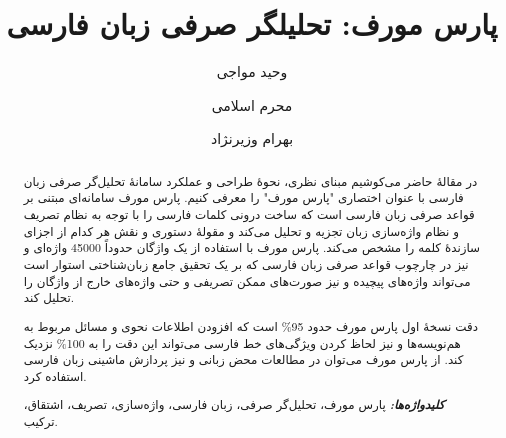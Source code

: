 \documentclass[12pt,onecolumn,a4paper]{article}
\providecommand{\keywords}[1]{\textbf{\textit{کلیدواژه‌ها:}} #1}
\begin{document}
    \title{پارس مورف: تحلیلگر صرفی زبان فارسی}
    \author[1]{وحید مواجی}
    \author[2]{محرم اسلامی}
    \author[1]{بهرام وزیرنژاد}
    \date{}
    \maketitle

    \begin{abstract}
        در مقالهٔ حاضر می‌کوشیم مبنای نظری، نحوهٔ طراحی و عملکرد سامانهٔ تحلیل‌گر صرفی زبان فارسی با عنوان اختصاری "پارس مورف" را معرفی کنیم. پارس مورف سامانه‌ای مبتنی بر قواعد صرفی زبان فارسی است که ساخت درونی کلمات فارسی را با توجه به نظام تصریف و نظام واژه‌سازی زبان تجزیه و تحلیل می‌کند و مقولهٔ دستوری و نقش هر کدام از اجزای سازندهٔ کلمه را مشخص می‌کند. پارس مورف با استفاده از یک واژگان حدوداً 45000 واژه‌‌ای و نیز در چارچوب قواعد صرفی زبان فارسی که بر یک تحقیق جامع زبان‌شناختی استوار است می‌تواند واژه‌های پیچیده و نیز صورت‌های ممکن تصریفی و حتی واژه‌های خارج از واژگان را تحلیل کند.
        \par
        دقت نسخهٔ اول پارس مورف حدود 95\% است که افزودن اطلاعات نحوی و مسائل مربوط به هم‌نویسه‌ها و نیز لحاظ کردن ویژگی‌های خط فارسی می‌تواند این دقت را به 100\% نزدیک کند. از پارس مورف می‌توان در مطالعات محض زبانی و نیز پردازش ماشینی زبان فارسی استفاده کرد.
        \par
        \keywords{ پارس مورف، تحلیل‌گر صرفی، زبان فارسی، واژه‌سازی، تصریف، اشتقاق، ترکیب.}
    \end{abstract}
\end{document}
